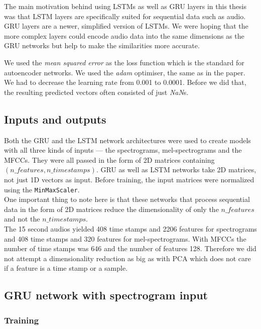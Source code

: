 The main motivation behind using LSTMs as well as GRU layers in this thesis was that LSTM layers are specifically suited for sequential data such as audio. GRU layers are a newer, simplified version of LSTMs. We were hoping that the more complex layers could encode audio data into the same dimensions as the GRU networks but help to make the similarities more accurate. 

We used the \textit{mean squared error} as the loss function which is the standard for autoencoder networks. We used the \textit{adam} optimiser, the same as in the \cite{inproceedings_RNNs} paper. We had to decrease the learning rate from 0.001 to 0.0001. Before we did that, the resulting predicted vectors often consisted of just \textit{NaN}s.

\subsection{Inputs and outputs}
Both the GRU and the LSTM network architectures were used to create models with all three kinds of inputs --- the spectrograms, mel-spectrograms and the MFCCs. They were all passed in the form of 2D matrices containing $(n\_features, n\_timestamps)$. GRU as well as LSTM networks take 2D matrices, not just 1D vectors as input. Before training, the input matrices were normalized using the \texttt{MinMaxScaler}. \\
One important thing to note here is that these networks that process sequential data in the form of 2D matrices reduce the dimensionality of only the $ n\_features $ and not the $ n\_timestamps $. \\
The 15 second audios yielded 408 time stamps and 2206 features for spectrograms and 408 time stamps and 320 features for mel-spectrograms. With MFCCs the number of time stamps was 646 and the number of features 128. Therefore we did not attempt a dimensionality reduction as big as with PCA which does not care if a feature is a time stamp or a sample. 

\subsection{GRU network with spectrogram input}\label{ssec:GRU_spec_experiments}

\subsubsection{Training}

